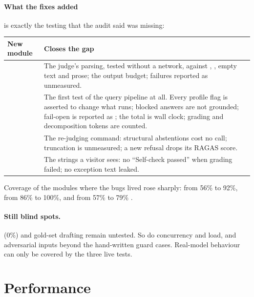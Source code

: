 \paragraph{What the fixes added} is exactly the testing that the audit said was missing:
\begin{center}\small
\begin{tabularx}{\textwidth}{@{}>{\raggedright\arraybackslash}p{4.6cm}L@{}}
\toprule
\textbf{New module} & \textbf{Closes the gap}\\
\midrule
{} & The judge's parsing, tested without a network, against , , empty text and prose; the output budget; failures reported as unmeasured.\\
 & The first test of the query pipeline at all. Every profile flag is asserted to change what runs; blocked answers are not grounded; fail-open is reported as ; the total is wall clock; grading and decomposition tokens are counted.\\
 & The re-judging command: structural abstentions cost no call; truncation is unmeasured; a new refusal drops its RAGAS score.\\
 & The strings a visitor sees: no ``Self-check passed'' when grading failed; no exception text leaked.\\
\bottomrule
\end{tabularx}
\end{center}
Coverage of the modules where the bugs lived rose sharply:  from 56\% to 92\%,  from 86\% to 100\%, and  from 57\% to 79\% \tagM.

\paragraph{Still blind spots.}  (0\%) and gold-set drafting remain untested. So do concurrency and load, and adversarial inputs beyond the hand-written guard cases. Real-model behaviour can only be covered by the three live tests.

\section{Performance}
\label{sec:performance}

